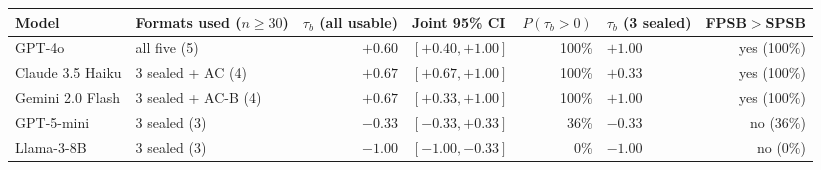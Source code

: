 \begin{tabular}{llrlrlr}
\toprule
Model & Formats used ($n\geq 30$) & $\tau_b$ (all usable) & Joint 95\% CI & $P(\tau_b>0)$ & $\tau_b$ (3 sealed) & FPSB$>$SPSB \\
\midrule
GPT-4o & all five (5) & $+0.60$ & $[+0.40, +1.00]$ & 100\% & $+1.00$ & yes (100\%) \\
Claude 3.5 Haiku & 3 sealed + AC (4) & $+0.67$ & $[+0.67, +1.00]$ & 100\% & $+0.33$ & yes (100\%) \\
Gemini 2.0 Flash & 3 sealed + AC-B (4) & $+0.67$ & $[+0.33, +1.00]$ & 100\% & $+1.00$ & yes (100\%) \\
GPT-5-mini & 3 sealed (3) & $-0.33$ & $[-0.33, +0.33]$ & 36\% & $-0.33$ & no (36\%) \\
Llama-3-8B & 3 sealed (3) & $-1.00$ & $[-1.00, -0.33]$ & 0\% & $-1.00$ & no (0\%) \\
\bottomrule
\end{tabular}
